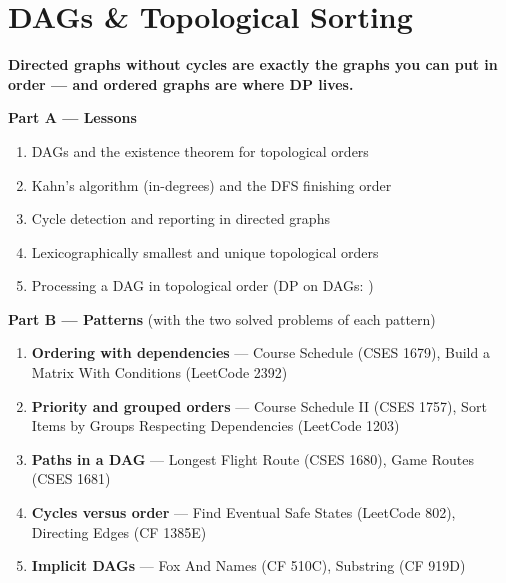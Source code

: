 \chapter{DAGs \& Topological Sorting}
\label{ch:dag}

\begin{tcolorbox}[enhanced, colback=white, colframe=secondaryblue, boxrule=1pt, arc=2mm]
\textbf{\large\textcolor{primaryblue}{Directed graphs without cycles are exactly the graphs you can put in order --- and ordered graphs are where DP lives.}}
\end{tcolorbox}


\begin{plannedbox}
\textbf{Part A --- Lessons}
\begin{enumerate}[leftmargin=*, label=\textbf{A\arabic*.}, itemsep=1pt]
    \item DAGs and the existence theorem for topological orders
    \item Kahn's algorithm (in-degrees) and the DFS finishing order
    \item Cycle detection and reporting in directed graphs
    \item Lexicographically smallest and unique topological orders
    \item Processing a DAG in topological order (DP on DAGs: )
\end{enumerate}
\textbf{Part B --- Patterns} (with the two solved problems of each pattern)
\begin{enumerate}[leftmargin=*, label=\textbf{P\arabic*.}, itemsep=1pt]
    \item \textbf{Ordering with dependencies} --- Course Schedule {\small\color{darkgray}(CSES 1679)}, Build a Matrix With Conditions {\small\color{darkgray}(LeetCode 2392)}
    \item \textbf{Priority and grouped orders} --- Course Schedule II {\small\color{darkgray}(CSES 1757)}, Sort Items by Groups Respecting Dependencies {\small\color{darkgray}(LeetCode 1203)}
    \item \textbf{Paths in a DAG} --- Longest Flight Route {\small\color{darkgray}(CSES 1680)}, Game Routes {\small\color{darkgray}(CSES 1681)}
    \item \textbf{Cycles versus order} --- Find Eventual Safe States {\small\color{darkgray}(LeetCode 802)}, Directing Edges {\small\color{darkgray}(CF 1385E)}
    \item \textbf{Implicit DAGs} --- Fox And Names {\small\color{darkgray}(CF 510C)}, Substring {\small\color{darkgray}(CF 919D)}
\end{enumerate}
\end{plannedbox}
